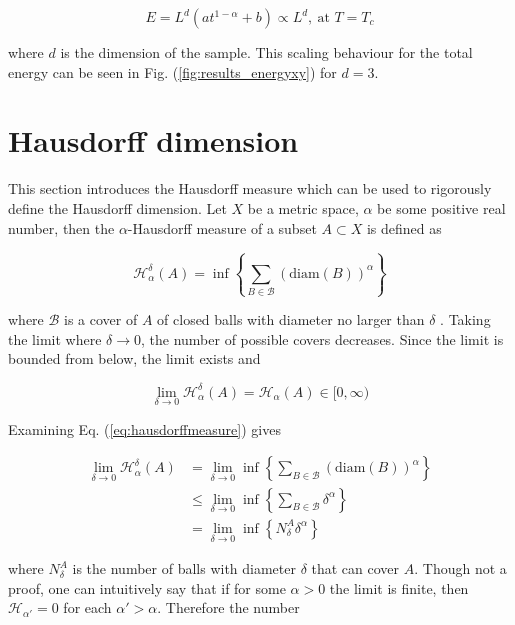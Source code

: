 \begin{equation}
    E = L^d ( a t^{1 - \alpha} + b ) \propto L^d, \ \text{at $T = T_c$}
\end{equation}

\noindent where $d$ is the dimension of the sample. This scaling behaviour for the total energy can be seen in Fig. (\ref{fig:results_energyxy}) for $d = 3$.

\section{Hausdorff dimension}
\label{sec:hausdorffdimension}

This section introduces the Hausdorff measure which can be used to rigorously define the Hausdorff dimension. Let $X$ be a metric space, $\alpha$ be some positive real number, then the $\alpha$-Hausdorff measure of a subset $A \subset X$ is defined as 

\begin{equation}
    \mathcal{H}^{\delta}_\alpha (A) = \inf \left \{ \sum_{B \in \mathcal{B}} \left ( \text{diam}(B) \right)^\alpha \right \}
\end{equation}

\noindent where $\mathcal{B}$ is a cover of $A$ of closed balls with diameter no larger than $\delta$ \cite{Heinonen:HausdorffDimMath}. Taking the limit where $\delta \to 0$, the number of possible covers decreases. Since the limit is bounded from below, the limit exists \cite{Rudin:PrincMathAnalysis} and

\begin{equation}
    \lim_{\delta \to 0} \mathcal{H}^{\delta}_{\alpha} (A) = \mathcal{H}_\alpha (A) \in [0, \infty )
\label{eq:hausdorffmeasure}
\end{equation}

Examining Eq. (\ref{eq:hausdorffmeasure}) gives

\begin{align}
    \lim_{\delta \to 0} \mathcal{H}^{\delta}_{\alpha} (A) &= \lim_{\delta \to 0} \inf \left \{ \sum_{B \in \mathcal{B}} \left ( \text{diam}(B) \right)^\alpha \right \} \\
%
    &\leq \lim_{\delta \to 0} \inf \left \{ \sum_{B \in \mathcal{B}} \delta^\alpha \right \} \\
%
    &= \lim_{\delta \to 0} \inf \left \{ N_{\delta}^A \delta^\alpha \right \}
\end{align}

\noindent where $N_{\delta}^A$ is the number of balls with diameter $\delta$ that can cover $A$. Though not a proof, one can intuitively say that if for some $\alpha > 0$ the limit is finite, then $\mathcal{H}_{\alpha'} = 0$ for each $\alpha' > \alpha$. Therefore the number

